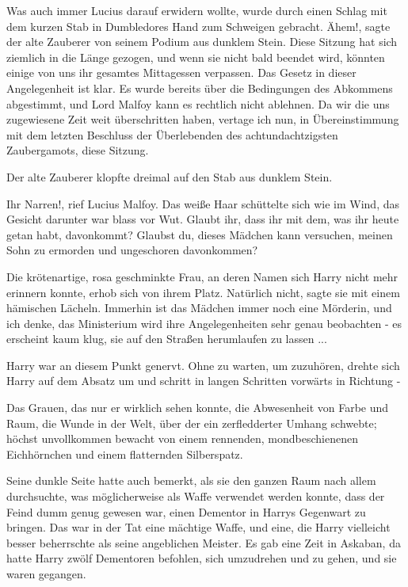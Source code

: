 Was auch immer Lucius darauf erwidern wollte, wurde durch einen Schlag mit dem
kurzen Stab in Dumbledores Hand zum Schweigen gebracht. \glqq{}Ähem!\grqq{},
sagte der alte Zauberer von seinem Podium aus dunklem Stein. \glqq{}Diese Sitzung
hat sich ziemlich in die Länge gezogen, und wenn sie nicht bald beendet wird,
könnten einige von uns ihr gesamtes Mittagessen verpassen. Das Gesetz in dieser
Angelegenheit ist klar. Es wurde bereits über die Bedingungen des Abkommens
abgestimmt, und Lord Malfoy kann es rechtlich nicht ablehnen. Da wir die uns
zugewiesene Zeit weit überschritten haben, vertage ich nun, in Übereinstimmung
mit dem letzten Beschluss der Überlebenden des achtundachtzigsten Zaubergamots,
diese Sitzung.\grqq{}

Der alte Zauberer klopfte dreimal auf den Stab aus dunklem Stein.

\glqq{}Ihr Narren!\grqq{}, rief Lucius Malfoy. Das weiße Haar schüttelte sich wie
im Wind, das Gesicht darunter war blass vor Wut. \glqq{}Glaubt ihr, dass ihr mit
dem, was ihr heute getan habt, davonkommt? Glaubst du, dieses Mädchen kann
versuchen, meinen Sohn zu ermorden und ungeschoren davonkommen?\grqq{}

Die krötenartige, rosa geschminkte Frau, an deren Namen sich Harry nicht mehr
erinnern konnte, erhob sich von ihrem Platz. \glqq{}Natürlich nicht\grqq{}, sagte
sie mit einem hämischen Lächeln. \glqq{}Immerhin ist das Mädchen immer noch eine
Mörderin, und ich denke, das Ministerium wird ihre Angelegenheiten sehr genau
beobachten - es erscheint kaum klug, sie auf den Straßen herumlaufen zu
lassen ...\grqq{}

Harry war an diesem Punkt genervt. Ohne zu warten, um zuzuhören, drehte sich
Harry auf dem Absatz um und schritt in langen Schritten vorwärts in Richtung -

Das Grauen, das nur er wirklich sehen konnte, die Abwesenheit von Farbe und
Raum, die Wunde in der Welt, über der ein zerfledderter Umhang schwebte; höchst
unvollkommen bewacht von einem rennenden, mondbeschienenen Eichhörnchen und
einem flatternden Silberspatz.

Seine dunkle Seite hatte auch bemerkt, als sie den ganzen Raum nach allem
durchsuchte, was möglicherweise als Waffe verwendet werden konnte, dass der
Feind dumm genug gewesen war, einen Dementor in Harrys Gegenwart zu bringen. Das
war in der Tat eine mächtige Waffe, und eine, die Harry vielleicht besser
beherrschte als seine angeblichen Meister. Es gab eine Zeit in Askaban, da hatte
Harry zwölf Dementoren befohlen, sich umzudrehen und zu gehen, und sie waren
gegangen.

